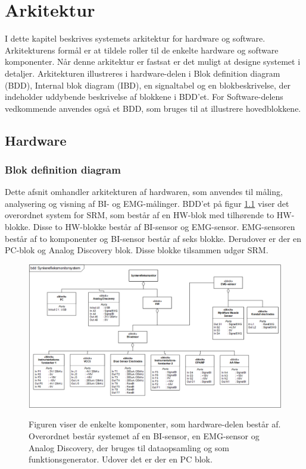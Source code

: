 \chapter{Arkitektur}

I dette kapitel beskrives systemets arkitektur for hardware og software. Arkitekturens formål er at tildele roller til de enkelte hardware og software komponenter. Når denne arkitektur er fastsat er det muligt at designe systemet i detaljer. Arkitekturen illustreres i hardware-delen i Blok definition diagram (BDD), Internal blok diagram (IBD), en signaltabel og en blokbeskrivelse, der indeholder uddybende beskrivelse af blokkene i BDD'et. For Software-delens vedkommende anvendes også et BDD, som bruges til at illustrere hovedblokkene.

\section{Hardware}
\subsection{Blok definition diagram}

Dette afsnit omhandler arkitekturen af hardwaren, som anvendes til måling, analysering og visning af BI- og EMG-målinger. BDD'et på figur \ref{fig:arkitekturBDD} viser det overordnet system for SRM, som består af en HW-blok med tilhørende to HW-blokke. Disse to HW-blokke består af BI-sensor og EMG-sensor. EMG-sensoren består af to komponenter og BI-sensor består af seks blokke. Derudover er der en PC-blok og Analog Discovery blok. Disse blokke tilsammen udgør SRM.

\begin{figure}[H] 
\centering
{\includegraphics[width=13cm]
{Figure/BDD}}
\caption{Figuren viser de enkelte komponenter, som hardware-delen består af. Overordnet består
systemet af en BI-sensor, en EMG-sensor og Analog Discovery, der bruges til dataopsamling og som funktionsgenerator. Udover det er der en PC blok.}
\label{fig:arkitekturBDD}
\end{figure}



